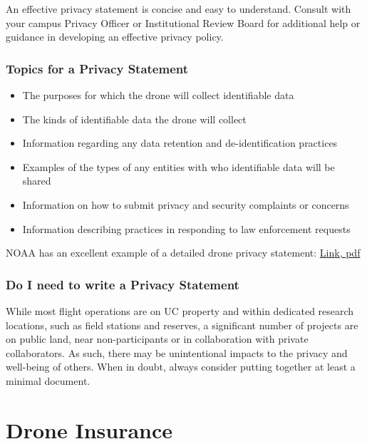 \documentclass[
  12pt,
]{book}
\providecommand{\tightlist}{%
  \setlength{\itemsep}{0pt}\setlength{\parskip}{0pt}}
\begin{document}
An effective privacy statement is concise and easy to understand. Consult with your campus Privacy Officer or Institutional Review Board for additional help or guidance in developing an effective privacy policy.

\hypertarget{topics-for-a-privacy-statement}{%
\subsection{Topics for a Privacy Statement}\label{topics-for-a-privacy-statement}}

\begin{itemize}
\tightlist
\item
  The purposes for which the drone will collect identifiable data
\item
  The kinds of identifiable data the drone will collect
\item
  Information regarding any data retention and de-identification practices
\item
  Examples of the types of any entities with who identifiable data will be shared
\item
  Information on how to submit privacy and security complaints or concerns
\item
  Information describing practices in responding to law enforcement requests
\end{itemize}

NOAA has an excellent example of a detailed drone privacy statement: \protect\hyperlink{https:ux2fux2fwww.cio.noaa.govux2fitmanagementux2fpdfsux2fSigned_UAS_PrivacyPolicy.pdf}{Link, pdf}

\hypertarget{do-i-need-to-write-a-privacy-statement}{%
\subsection{Do I need to write a Privacy Statement}\label{do-i-need-to-write-a-privacy-statement}}

While most flight operations are on UC property and within dedicated research locations, such as field stations and reserves, a significant number of projects are on public land, near non-participants or in collaboration with private collaborators. As such, there may be unintentional impacts to the privacy and well-being of others. When in doubt, always consider putting together at least a minimal document.

\hypertarget{insurance}{%
\chapter{Drone Insurance}\label{insurance}}
\end{document}
